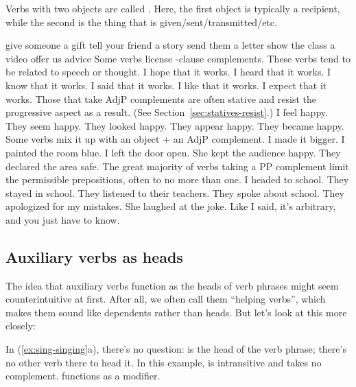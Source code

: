 Verbs with two objects are called . Here, the first object is typically a recipient, while the second is the thing that is given/sent/transmitted/etc.

\ea \label{ex:ditransitive}
\ea give someone a gift
\ex tell your friend a story
\ex send them a letter
\ex show the class a video
\ex offer us advice
\z\z
\noindent Some verbs license -clause complements. These verbs tend to be related to speech or thought.
\ea \label{ex:that-comps}
\ea I hope that it works.
\ex I heard that it works.
\ex I know that it works.
\ex I said that it works.
\ex I like that it works.
\ex I expect that it works.
\z\z
\noindent Those that take AdjP complements are often stative and resist the progressive aspect as a result. (See Section~\ref{sec:statives-resist}.)
\ea \label{ex:AdjP-comps}
\ea I feel happy.
\ex They seem happy.
\ex They looked happy.
\ex They appear happy.
\ex They became happy.
\z\z
\noindent Some verbs mix it up with an object + an AdjP complement.
\ea \label{ex:obj+AdjP-comps}
\ea I made it bigger.
\ex I painted the room blue.
\ex I left the door open.
\ex She kept the audience happy.
\ex They declared the area safe.
\z\z
\noindent The great majority of verbs taking a PP complement limit the permissible prepositions, often to no more than one.
\ea \label{ex:PP-comps}
\ea I headed to school.
\ex They stayed in school.
\ex They listened to their teachers.
\ex They spoke about school.
\ex They apologized for my mistakes.
\ex She laughed at the joke.
\z\z
Like I said, it's arbitrary, and you just have to know.

\subsection{Auxiliary verbs as heads}\label{sec:Aux-as-head}

The idea that auxiliary verbs function as the heads of verb phrases might seem counterintuitive at first. After all, we often call them ``helping verbs'', which makes them sound like dependents rather than heads. But let's look at this more closely:

In (\ref{ex:sing-singing}a), there's no question:  is the head of the verb phrase; there's no other verb there to head it. In this example,  is intransitive and takes no complement.  functions as a modifier.

